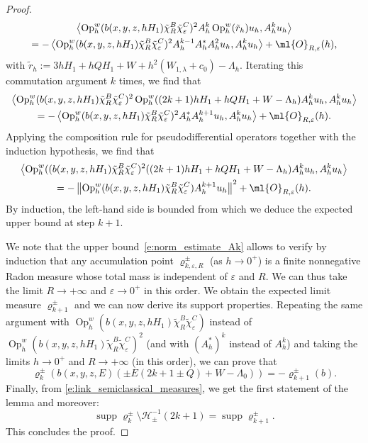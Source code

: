 \documentclass[10pt]{amsart}
\theoremstyle{plain}
\theoremstyle{definition}
\theoremstyle{remark}
\newcommand{\Op}{\operatorname{Op}}
\begin{document}
\begin{proof}
\begin{multline*}
\left\langle \Op_h^w(b(x,y,z,hH_1)\tilde{\chi}_R^B\tilde{\chi}_\varepsilon^C)^2A_h^k\Op_h^w(\tilde{r}_h)u_h,A_h^ku_h\right\rangle \\
=-\left\langle \Op_h^w(b(x,y,z,hH_1)\tilde{\chi}_R^B\tilde{\chi}_\varepsilon^C)^2A_h^{k-1}A_h^*A_h^2 u_h,A_h^ku_h\right\rangle+ \ml{O}_{R,\varepsilon}(h),
\end{multline*}
with $\tilde{r}_h:=3hH_1+hQH_1+W+h^2(W_{1,\lambda}+c_0)-\Lambda_h$. Iterating this commutation argument $k$ times, we find that
\begin{multline*}
\left\langle \Op_h^w(b(x,y,z,hH_1)\tilde{\chi}_R^B\tilde{\chi}_\varepsilon^C)^2\Op_h^w((2k+1)hH_1+hQH_1+W-\Lambda_h) A_h^ku_h,A_h^ku_h\right\rangle \\
=-\left\langle \Op_h^w(b(x,y,z,hH_1)\tilde{\chi}_R^B\tilde{\chi}_\varepsilon^C)^2A_h^*A_h^{k+1} u_h,A_h^ku_h\right\rangle
+ \ml{O}_{R,\varepsilon}(h).
\end{multline*}
Applying the composition rule for pseudodifferential operators together with the induction hypothesis, we find that
\begin{multline*}
\left\langle \Op_h^w((b(x,y,z,hH_1)\tilde{\chi}_R^B\tilde{\chi}_\varepsilon^C)^2((2k+1)hH_1+hQH_1+W-\Lambda_h) A_h^ku_h,A_h^ku_h\right\rangle \\
=-\left\|\Op_h^w(b(x,y,z,hH_1)\tilde{\chi}_R^B\tilde{\chi}_\varepsilon^C)A_h^{k+1} u_h\right\|^2
+ \ml{O}_{R,\varepsilon}(h).
\end{multline*}
By induction, the left-hand side is bounded from which we deduce the expected upper bound at step $k+1$.

We note that the upper bound~\eqref{e:norm_estimate_Ak} allows to verify by induction that any accumulation point $\varrho_{k,\varepsilon,R}^\pm$ (as $h\to 0^+$) is a finite nonnegative Radon measure whose total mass is independent of $\varepsilon$ and $R$. We can thus take the limit $R\to +\infty$ and $\varepsilon\to 0^+$ in this order. We obtain the expected limit measure $\varrho_{k+1}^\pm$ and we can now derive its support properties. Repeating the same argument with $\Op_h^w(b(x,y,z,hH_1)\tilde{\chi}_R^B\tilde{\chi}_\varepsilon^C)$ instead of $\Op_h^w(b(x,y,z,hH_1)\tilde{\chi}_R^B\tilde{\chi}_\varepsilon^C)^2$ (and with $(A_h^*)^k$ instead of $A_h^k$) and taking the limits $h\to 0^+$ and $R\to +\infty$ (in this order), we can prove that
\begin{equation}
\label{e:link_semiclassical_measures}
\varrho_{k}^{\pm}\left(b(x,y,z,E)(\pm E(2k+1 \pm Q)+W-\Lambda_0)\right)= - \varrho^\pm_{k+1}(b).
\end{equation}
Finally, from \eqref{e:link_semiclassical_measures}, we get the first statement of the lemma and moreover:
\[
\operatorname{supp} \varrho_{k}^{\pm} \setminus \mathcal{H}_\pm^{-1}(2k+1) = \operatorname{supp} \varrho_{k+1}^{\pm}.
\]
This concludes the proof.
\end{proof}
\end{document}
